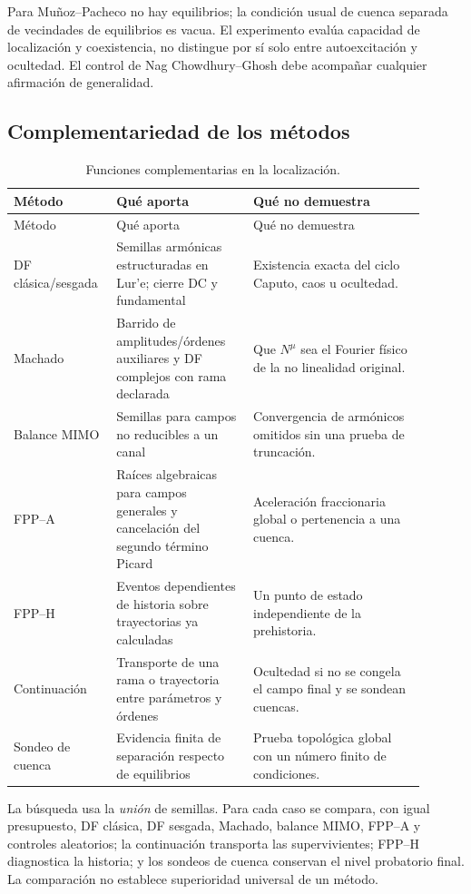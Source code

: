 Para Muñoz--Pacheco no hay equilibrios; la condición usual de cuenca separada
de vecindades de equilibrios es vacua. El experimento evalúa capacidad de
localización y coexistencia, no distingue por sí solo entre autoexcitación y
ocultedad. El control de Nag Chowdhury--Ghosh debe acompañar cualquier
afirmación de generalidad.

\subsection{Complementariedad de los métodos}

\begin{longtable}{@{}L{0.20\linewidth}L{0.31\linewidth}L{0.39\linewidth}@{}}
\caption{Funciones complementarias en la localización.}
\label{tab:method-complementarity}\\
\toprule
Método & Qué aporta & Qué no demuestra\\
\midrule
\endfirsthead
\toprule
Método & Qué aporta & Qué no demuestra\\
\midrule
\endhead
DF clásica/sesgada & Semillas armónicas estructuradas en Lur'e; cierre DC y
fundamental & Existencia exacta del ciclo Caputo, caos u ocultedad.\\
Machado & Barrido de amplitudes/órdenes auxiliares y DF complejos con rama
declarada & Que \(N^\mu\) sea el Fourier físico de la no linealidad original.\\
Balance MIMO & Semillas para campos no reducibles a un canal & Convergencia de
armónicos omitidos sin una prueba de truncación.\\
FPP--A & Raíces algebraicas para campos generales y cancelación del segundo
término Picard & Aceleración fraccionaria global o pertenencia a una cuenca.\\
FPP--H & Eventos dependientes de historia sobre trayectorias ya calculadas &
Un punto de estado independiente de la prehistoria.\\
Continuación & Transporte de una rama o trayectoria entre parámetros y
órdenes & Ocultedad si no se congela el campo final y se sondean cuencas.\\
Sondeo de cuenca & Evidencia finita de separación respecto de equilibrios &
Prueba topológica global con un número finito de condiciones.\\
\bottomrule
\end{longtable}

La búsqueda usa la \emph{unión} de semillas. Para cada caso se
compara, con igual presupuesto, DF clásica, DF sesgada, Machado, balance MIMO,
FPP--A y controles aleatorios; la continuación transporta las supervivientes;
FPP--H diagnostica la historia; y los sondeos de cuenca conservan el nivel
probatorio final. La comparación no establece superioridad universal de un
método.

